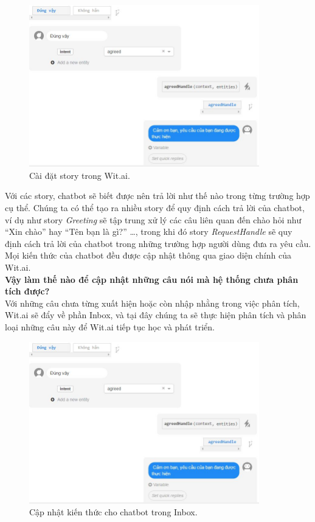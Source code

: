 \documentclass[12pt]{report}
\begin{document}
\begin{figure}[H] \label{fig:story-wit}
	\centering
	\includegraphics[width=10cm]{Pics/Chap6/story.JPG}
	\caption{Cài đặt story trong Wit.ai.}
\end{figure}

Với các story, chatbot sẽ biết được nên trả lời như thế nào trong từng trường hợp cụ thể. Chúng ta có thể tạo ra nhiều story để quy định cách trả lời của chatbot, ví dụ như story \textit{Greeting} sẽ tập trung xử lý các câu liên quan đến chào hỏi như ``Xin chào'' hay ``Tên bạn là gì?'' \ldots, trong khi đó story \textit{RequestHandle} sẽ quy định cách trả lời của chatbot trong những trường hợp người dùng đưa ra yêu cầu. Mọi kiến thức của chatbot đều được cập nhật thông qua giao diện chính của Wit.ai. \\[0.5cm]
\noindent \textbf{Vậy làm thế nào để cập nhật những câu nói mà hệ thống chưa phân tích được?\\[0.5cm]}
Với những câu chưa từng xuất hiện hoặc còn nhập nhằng trong việc phân tích, Wit.ai sẽ đẩy về phần Inbox, và tại đây chúng ta sẽ thực hiện phân tích và phân loại những câu này để Wit.ai tiếp tục học và phát triển.

\begin{figure}[H] \label{fig:inbox-wit}
	\centering
	\includegraphics[width=10cm]{Pics/Chap6/story.JPG}
	\caption{Cập nhật kiến thức cho chatbot trong Inbox.}
\end{figure}
\end{document}
